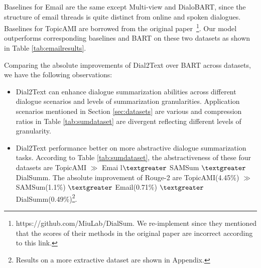 Baselines for Email are the same except Multi-view and DialoBART, since the structure of email threads is quite distinct from online and spoken dialogues. Baselines for TopicAMI are borrowed from the original paper~\cite{goo2018abstractive}\footnote{https://github.com/MiuLab/DialSum. We re-implement since they mentioned that the scores of their methods in the original paper are incorrect according to this link.}. 
Our model outperforms corresponding baselines and BART on these two datasets as shown in Table \ref{tab:emailresults}.

Comparing the absolute improvements of Dial2Text over BART across datasets, we have the following observations:
\begin{itemize}
	\item Dial2Text can enhance dialogue summarization abilities across different dialogue scenarios and levels of summarization granularities. Application scenarios mentioned in Section \ref{sec:datasets} are various and compression ratios in Table \ref{tab:sumdataset} are divergent reflecting different levels of granularity.
	\item Dial2Text performance better on more abstractive dialogue summarization tasks. According to Table \ref{tab:sumdataset}, the abstractiveness of these four datasets are TopicAMI $\gg$ Emai l$\textgreater$ SAMSum $\textgreater$ DialSumm. The absolute improvement of Rouge-2 are TopicAMI(4.45\%) $\gg$ SAMSum(1.1\%)
	$\textgreater$ Email(0.71\%) $\textgreater$ DialSumm(0.49\%)\footnote{Results on a more extractive dataset are shown in Appendix.}.
\end{itemize}







